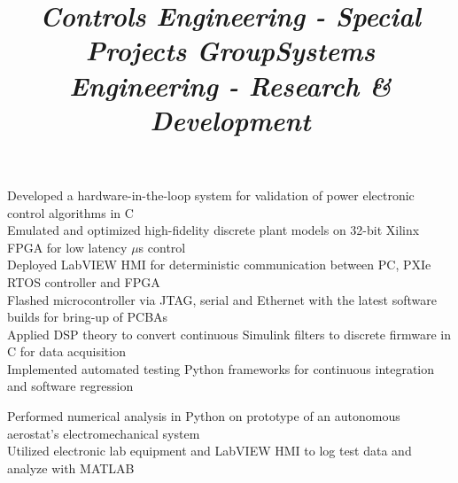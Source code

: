 \documentclass[mm]{res}
\begin{document}
\begin{resume}
\title{\textsl{Controls Engineering - Special Projects Group}}
\begin{position}
\tb Developed a hardware-in-the-loop system for validation of power electronic control algorithms in C\\
\tb Emulated and optimized high-fidelity discrete plant models on 32-bit Xilinx FPGA for low latency $\mu$s control\\
\tb Deployed LabVIEW HMI for deterministic communication between PC, PXIe RTOS controller and FPGA\\
\tb Flashed microcontroller via JTAG, serial and Ethernet with the latest software builds for bring-up of PCBAs\\
\tb Applied DSP theory to convert continuous Simulink filters to discrete firmware in C for data acquisition\\
\tb Implemented automated testing Python frameworks for continuous integration and software regression
\end{position}

\title{\textsl{Systems Engineering - Research \& Development}}
\begin{position}
\tb Performed numerical analysis in Python on prototype of an autonomous aerostat's electromechanical system\\
\tb Utilized electronic lab equipment and LabVIEW HMI to log test data and analyze with MATLAB
\end{position}


\end{resume}
\end{document}

